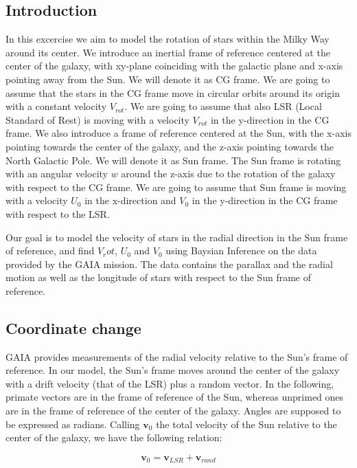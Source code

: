 \subsection{Introduction}

In this excercise we aim to model the rotation of stars within the Milky Way around its center. 
We introduce an inertial frame of reference centered at the center of the galaxy, 
with xy-plane coinciding with the galactic plane and x-axis pointing away from the Sun. We will denote it as CG frame.
We are going to assume that the stars in the CG frame move in circular orbits around its origin with a constant velocity $V_{rot}$.
We are going to assume that also LSR (Local Standard of Rest) is moving with a velocity $V_{rot}$ in the y-direction in the CG frame.
We also introduce a frame of reference centered at the Sun, with the x-axis pointing towards the center of the galaxy, 
and the z-axis pointing towards the North Galactic Pole. We will denote it as Sun frame.
The Sun frame is rotating with an angular velocity $w$ around the z-axis due to the rotation of the galaxy with respect to the CG frame.
We are going to assume that Sun frame is moving with a velocity $U_0$ in the x-direction and $V_0$ in the y-direction in the CG frame with respect to the LSR.

Our goal is to model the velocity of stars in the radial direction in the Sun frame of reference, 
and find $V_rot$, $U_0$ and $V_0$ using Baysian Inference on the data provided by the GAIA mission. 
The data contains the parallax and the radial motion as well as the longitude of stars with respect to the Sun frame of reference.

\subsection{Coordinate change}

GAIA provides measurements of the radial velocity relative to the Sun's frame of reference. In our model, the Sun's frame moves around the center of the galaxy with a drift velocity (that of the LSR) plus a random vector.
In the following, primate vectors are in the frame of reference of the Sun, whereas unprimed ones are in the frame of reference of the center of the galaxy. Angles are supposed to be expressed as radians. 
Calling $\bm{v}_0$ the total velocity of the Sun relative to the center of the galaxy, we have the following relation:

\begin{equation}\label{eq:SunVelocity}
    \bm{v}_0 = \bm{v}_{LSR} + \bm{v}_{rand}
\end{equation}

